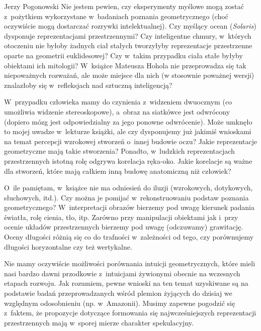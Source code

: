 \begin{newrevplenv}{Jerzy Pogonowski}
Nie jestem pewien, czy eksperymenty myślowe mogą zostać z~pożytkiem wykorzystane w~badaniach poznania geometrycznego (choć
oczywiście mogą dostarczać rozrywki intelektualnej). Czy myślący
ocean ({\em Solaris}) dysponuje reprezentacjami przestrzennymi?
Czy inteligentne chmury, w~których otoczeniu nie byłoby żadnych
ciał stałych tworzyłyby reprezentacje przestrzenne oparte na
geometrii euklidesowej? Czy w~takim przypadku ciała stałe byłyby
obiektami ich mitologii? W~książce Mateusza Hohola nie
przeprowadza się tak niepoważnych rozważań, ale może miejsce dla
nich (w stosownie poważnej wersji) znalazłoby się w~refleksjach
nad sztuczną inteligencją?

W~przypadku człowieka mamy do czynienia z~widzeniem dwuocznym (co
umożliwia widzenie stereoskopowe), a~obraz na siatkówce jest
odwrócony (dopiero mózg jest odpowiedzialny za jego ponowne
odwrócenie). Może umknęło to mojej uwadze w~lekturze książki, ale
czy dysponujemy już jakimiś wnioskami na temat percepcji wzrokowej
stworzeń o~innej budowie oczu? Jakie reprezentacje geometryczne
mają takie stworzenia? Ponadto, w~ludzkich reprezentacjach
przestrzennych istotną rolę odgrywa korelacja ręka-oko. Jakie
korelacje są ważne dla stworzeń, które mają całkiem inną budowę
anatomiczną niż człowiek?

O~ile pamiętam, w~książce nie ma odniesień do iluzji (wzrokowych,
dotykowych, słuchowych, itd.). Czy można je pomijać w~rekonstruowaniu podstaw poznania geometrycznego? W~interpretacji
obrazów bierzemy pod uwagę kierunek padania światła, rolę cienia,
tło, itp. Zarówno przy manipulacji obiektami jak i~przy ocenie
układów przestrzennych bierzemy pod uwagę (odczuwamy) grawitację.
Oceny długości różnią się co do trafności w~zależności od tego,
czy porównujemy długości horyzontalne czy też wertykalne.

Nie mamy oczywiście możliwości porównania intuicji geometrycznych,
które mieli nasi bardzo dawni przodkowie z~intuicjami żywionymi
obecnie na wczesnych etapach rozwoju. Jak rozumiem, pewne wnioski
na ten temat uzyskiwane są na podstawie badań przeprowadzanych
wśród plemion żyjących do dzisiaj we względnym odosobnieniu (np. w~Amazonii). Musimy zapewne pogodzić się z~faktem, że propozycje
dotyczące formowania się najwcześniejszych reprezentacji
przestrzennych mają w~sporej mierze charakter spekulacyjny.


\end{newrevplenv}
